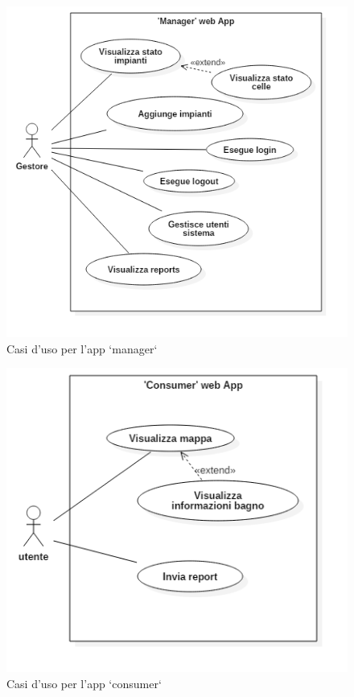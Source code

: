 \documentclass[12pt]{article}
\begin{document}
\begin{figure}[h!]
  \includegraphics[scale=0.7]{img/usecase_manager.png}
  \caption{Casi d'uso per l'app `manager`}
  \label{fig:usecase_manager}
\end{figure}
\begin{figure}[h!]
  \includegraphics[scale=0.7]{img/usecase_consumer.png}
  \caption{Casi d'uso per l'app `consumer`}
  \label{fig:usecase_consumer}
\end{figure}
\newpage
\phantom{}
\newpage
\end{document}
